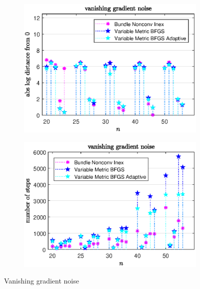\begin{figure}[H]
	\begin{subfigure}{0.49\textwidth}
		\includegraphics[width=\textwidth]{Pictures/Plots/vanishing_gradient_noise_b.eps}%
	\end{subfigure}
	\begin{subfigure}{0.49\textwidth}
		\includegraphics[width=\textwidth]{Pictures/Plots/steps_vanishing_gradient_noise_b.eps}%
	\end{subfigure}
	\caption{Vanishing gradient noise}%
	\label{fig_van_grad_noise_large}%
\end{figure}


